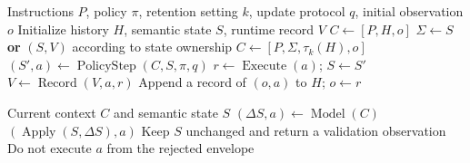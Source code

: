 \begin{algorithm}[H]
\caption{Context selection and state ownership}
\label{alg:context}
\begin{algorithmic}[1]
\Require Instructions $P$, policy $\pi$, retention setting $k$, update protocol $q$, initial observation $o$
\State Initialize history $H$, semantic state $S$, runtime record $V$
    \State $C \gets [P,H,o]$
  \Else
    \State $\Sigma \gets S$ \textbf{or} $(S,V)$ according to state ownership
    \State $C \gets [P,\Sigma,\tau_k(H),o]$
  \EndIf
  \State $(S',a) \gets \operatorname{PolicyStep}(C,S,\pi,q)$
  \State $r \gets \operatorname{Execute}(a)$; $S \gets S'$
    \State $V \gets \operatorname{Record}(V,a,r)$
  \EndIf
  \State Append a record of $(o,a)$ to $H$; $o \gets r$
\EndWhile
\end{algorithmic}
\end{algorithm}
\begin{algorithm}[H]
\caption{Inline patch--action contract}
\label{alg:inline}
\begin{algorithmic}[1]
\Require Current context $C$ and semantic state $S$
\State $(\Delta S,a) \gets \operatorname{Model}(C)$
  \State \Return $(\operatorname{Apply}(S,\Delta S),a)$
\Else
  \State Keep $S$ unchanged and return a validation observation
  \State Do not execute $a$ from the rejected envelope
\EndIf
\end{algorithmic}
\end{algorithm}
